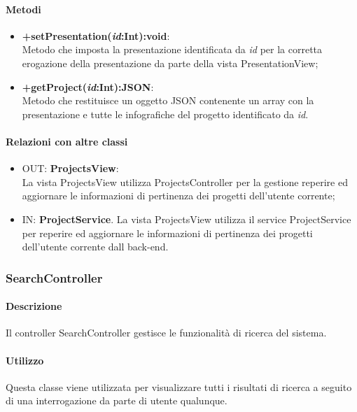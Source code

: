 	\paragraph{Metodi}
	\begin{itemize}
	  \item \textbf{+setPresentation(\textit{id}:Int):void}:\\
		  Metodo che imposta la presentazione identificata da  \textit{id} per la corretta erogazione della presentazione da parte della vista PresentationView;
	  \item \textbf{+getProject(\textit{id}:Int):JSON}:\\
		  Metodo che restituisce un oggetto JSON contenente un array con la presentazione e tutte le infografiche del progetto identificato da \textit{id}.
		  
	\end{itemize}
	\paragraph{Relazioni con altre classi}
	\begin{itemize}
	  \item OUT: \textbf{ProjectsView}:\\
		La vista ProjectsView utilizza ProjectsController per la gestione reperire ed aggiornare le informazioni di pertinenza dei progetti dell'utente corrente;	
	  \item IN: \textbf{ProjectService}.
		La vista ProjectsView utilizza il service ProjectService per reperire ed aggiornare le informazioni di pertinenza dei progetti dell'utente corrente dall back-end.
	\end{itemize}		
\subsubsection{SearchController}
	\paragraph{Descrizione}
	Il controller SearchController gestisce le funzionalità di ricerca del sistema.
	
	\paragraph{Utilizzo}
	Questa classe viene utilizzata per visualizzare tutti i risultati di ricerca a seguito di una interrogazione da parte di utente qualunque.\\
